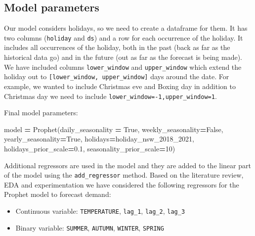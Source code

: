 \documentclass[mstat,12pt]{unswthesis}
\newenvironment{Shaded}{\begin{snugshade}}{\end{snugshade}}
\newcommand{\DecValTok}[1]{\textcolor[rgb]{0.00,0.00,0.81}{#1}}
\newcommand{\FloatTok}[1]{\textcolor[rgb]{0.00,0.00,0.81}{#1}}
\newcommand{\NormalTok}[1]{#1}
\newcommand{\OperatorTok}[1]{\textcolor[rgb]{0.81,0.36,0.00}{\textbf{#1}}}
\newcommand{\VariableTok}[1]{\textcolor[rgb]{0.00,0.00,0.00}{#1}}
\begin{document}
\subsection{Model parameters}\label{model-parameters}

Our model considers holidays, so we need to create a dataframe for them.
It has two columns (\texttt{holiday} and \texttt{ds}) and a row for each
occurrence of the holiday. It includes all occurrences of the holiday,
both in the past (back as far as the historical data go) and in the
future (out as far as the forecast is being made). We have included
columns \texttt{lower\_window} and \texttt{upper\_window} which extend
the holiday out to \texttt{{[}lower\_window,\ upper\_window{]}} days
around the date. For example, we wanted to include Christmas eve and
Boxing day in addition to Christmas day we need to include
\texttt{lower\_window=-1,upper\_window=1}.

Final model parameters:

\begin{Shaded}
\begin{Highlighting}[]
\NormalTok{model }\OperatorTok{=}\NormalTok{ Prophet(daily\_seasonality }\OperatorTok{=} \VariableTok{True}\NormalTok{, }
\NormalTok{                weekly\_seasonality}\OperatorTok{=}\VariableTok{False}\NormalTok{, }
\NormalTok{                yearly\_seasonality}\OperatorTok{=}\VariableTok{True}\NormalTok{,   }
\NormalTok{                holidays}\OperatorTok{=}\NormalTok{holiday\_nsw\_2018\_2021, }
\NormalTok{                holidays\_prior\_scale}\OperatorTok{=}\FloatTok{0.1}\NormalTok{, }
\NormalTok{                seasonality\_prior\_scale}\OperatorTok{=}\DecValTok{10}\NormalTok{)}
\end{Highlighting}
\end{Shaded}

Additional regressors are used in the model and they are added to the
linear part of the model using the \texttt{add\_regressor} method. Based
on the literature review, EDA and experimentation we have considered the
following regressors for the Prophet model to forecast demand:

\begin{itemize}
\item
  Continuous variable: \texttt{TEMPERATURE}, \texttt{lag\_1},
  \texttt{lag\_2}, \texttt{lag\_3}
\item
  Binary variable: \texttt{SUMMER}, \texttt{AUTUMN}, \texttt{WINTER},
  \texttt{SPRING}
\end{itemize}
\end{document}

